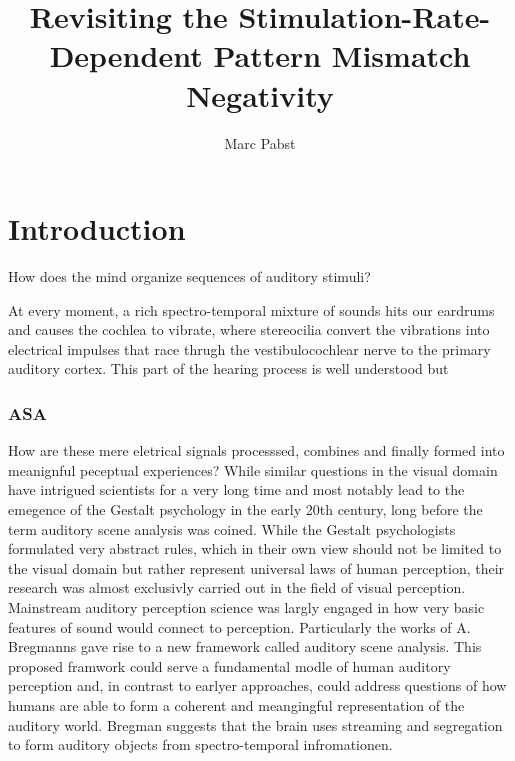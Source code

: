\documentclass[stu,a4paper,11pt,floatsintext]{apa7}
\title{Revisiting the Stimulation-Rate-Dependent Pattern Mismatch
Negativity}
\author{Marc Pabst}
\date{}
\begin{document}
\maketitle


\renewcommand*\contentsname{}

\setcounter{tocdepth}{3}
\tableofcontents

\hypertarget{introduction}{%
\section{Introduction}\label{introduction}}

How does the mind organize sequences of auditory stimuli?

At every moment, a rich spectro-temporal mixture of sounds hits our
eardrums and causes the cochlea to vibrate, where stereocilia convert
the vibrations into electrical impulses that race thrugh the
vestibulocochlear nerve to the primary auditory cortex. This part of the
hearing process is well understood but

\hypertarget{asa}{%
\subsubsection{ASA}\label{asa}}

How are these mere eletrical signals processsed, combines and finally
formed into meanignful peceptual experiences? While similar questions in
the visual domain have intrigued scientists for a very long time and
most notably lead to the emegence of the Gestalt psychology in the early
20th century, long before the term auditory scene analysis was coined.
While the Gestalt psychologists formulated very abstract rules, which in
their own view should not be limited to the visual domain but rather
represent universal laws of human perception, their research was almost
exclusivly carried out in the field of visual perception. Mainstream
auditory perception science was largly engaged in how very basic
features of sound would connect to perception. Particularly the works of
A. Bregmanns gave rise to a new framework called auditory scene
analysis. This proposed framwork could serve a fundamental modle of
human auditory perception and, in contrast to earlyer approaches, could
address questions of how humans are able to form a coherent and
meangingful representation of the auditory world. Bregman suggests that
the brain uses streaming and segregation to form auditory objects from
spectro-temporal infromationen.
\end{document}
